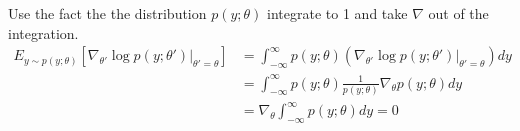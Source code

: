 \begin{answer}
    Use the fact the the distribution $p(y;\theta)$ integrate to 1 and take $\nabla$ out of the integration.
    $$
    \begin{aligned}
        E_{y\sim p(y;\theta)}[\nabla_{\theta'}\log p(y;\theta')|_{\theta' = \theta}] &= \int_{-\infty}^{\infty}p(y;\theta)(\nabla_{\theta'}\log p(y;\theta')|_{\theta' = \theta}) dy \\
        &= \int_{-\infty}^{\infty}p(y;\theta)\frac{1}{p(y;\theta)} \nabla_\theta p(y;\theta)dy\\
        &= \nabla_\theta \int_{-\infty}^{\infty}p(y;\theta)dy = 0
    \end{aligned}
    $$

\end{answer}
